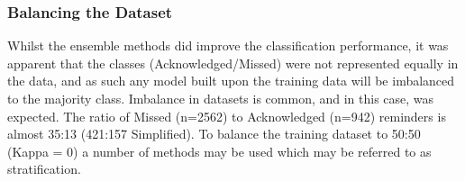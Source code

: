 \begin{table}[h]
\centering
\caption{Results of ensemble classifiers applied to DC dataset, showing statistical significance against J48 (C4.5 Decision Tree) as base comparison.}
\label{tbl: utah-ensemble-results}
\end{table}

\subsubsection{Balancing the Dataset}
Whilst the ensemble methods did improve the classification performance, it was apparent that the classes (Acknowledged/Missed) were not represented equally in the data, and as such any model built upon the training data will be imbalanced to the majority class. Imbalance in datasets is common, and in this case, was expected. The ratio of Missed (n=2562) to Acknowledged (n=942) reminders is almost 35:13 (421:157 Simplified). To balance the training dataset to 50:50 (Kappa = 0) a number of methods may be used which may be referred to as stratification.

